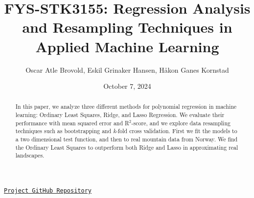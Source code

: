 \documentclass{article}
\title{FYS-STK3155: Regression Analysis and Resampling Techniques in Applied Machine Learning}
\author{Oscar Atle Brovold, Eskil Grinaker Hansen, Håkon Ganes Kornstad}
\date{October 7, 2024}
\begin{document}
\maketitle
\begin{center}
    \href{https://github.com/EOH-ML/FYS-STK3155-Projects/tree/main/project1}{\texttt{Project GitHub Repository}}
\end{center}


\begin{abstract}
\noindent In this paper, we analyze three different methods for polynomial regression in machine learning: Ordinary Least Squares, Ridge, and Lasso Regression. We evaluate their performance with mean squared error and R$^2$-score, and we explore data resampling techniques such as bootstrapping and \textit{k}-fold cross validation. First we fit the models to a two dimensional test function, and then to real mountain data from Norway. We find the Ordinary Least Squares to outperform both Ridge and Lasso in approximating real landscapes.
\end{abstract}
\vspace{15pt}
\end{document}

